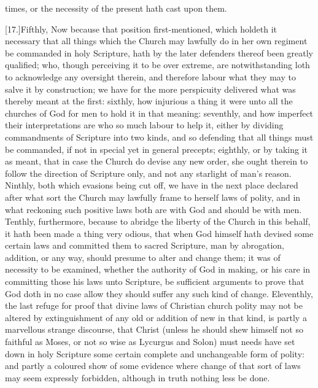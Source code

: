 times, or the necessity of the present hath cast upon them.


[17.]Fifthly, Now because that position first-mentioned, which holdeth it necessary that all things which the Church may lawfully do in her own regiment be commanded in holy Scripture, hath by the later defenders thereof been greatly qualified; who, though perceiving it to be over extreme, are notwithstanding loth to acknowledge any oversight therein, and therefore labour what they may to salve it by construction; we have for the more perspicuity delivered what was thereby meant at the first: sixthly, how injurious a thing it were unto all the churches of God for men to hold it in that meaning: seventhly, and how imperfect their interpretations are who so much labour to help it, either by dividing commandments of Scripture into two kinds, and so defending that all things must be commanded, if not in special yet in general precepts; eighthly, or by taking it as meant, that in case the Church do devise any new order, she ought therein to follow the direction of Scripture only, and not any starlight of man’s reason. Ninthly, both which evasions being cut off, we have in the next place declared after what sort the Church may lawfully frame to herself laws of polity, and in what reckoning such positive laws both are with God and should be with men. Tenthly, furthermore, because to abridge the liberty of the Church in this behalf, it hath been made a thing very odious, that when God himself hath devised some certain laws and committed them to sacred Scripture, man by abrogation, addition, or any way, should presume to alter and change them; it was of necessity to be examined, whether the authority of God in making, or his care in committing those his laws unto Scripture, be sufficient arguments to prove that God doth in no case allow they should suffer any such kind of change. Eleventhly, the last refuge for proof that divine laws of Christian church polity may not be altered by extinguishment of any old or addition of new in that kind, is partly a marvellous strange discourse, that Christ (unless he should shew himself not so faithful as Moses, or not so wise as Lycurgus and Solon) must needs have set down in holy  Scripture some certain complete and unchangeable form of polity: and partly a coloured show of some evidence where change of that sort of laws may seem expressly forbidden, although in truth nothing less be done.

